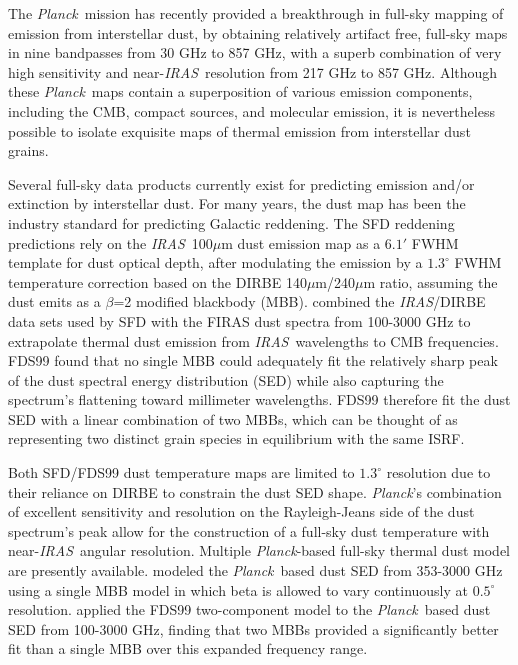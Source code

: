 \documentclass{emulateapj}
\newcommand{\IRAS}{{\it IRAS}}
\newcommand{\PLANCK}{{\it Planck}}
\begin{document}
The \PLANCK~mission \citep{planck2013,planck2015} has recently provided a 
breakthrough in full-sky mapping of emission from interstellar dust, by 
obtaining relatively artifact free, full-sky maps in nine bandpasses from 30 
GHz to 857 GHz, with a superb combination of very high sensitivity and 
near-\IRAS~resolution from 217 GHz to 857 GHz. Although these \PLANCK~maps 
contain a superposition of various emission components, including the CMB, 
compact sources, and molecular emission, it is nevertheless possible to isolate
exquisite maps of thermal emission from interstellar dust grains.

Several full-sky data products currently exist for predicting emission and/or
extinction by interstellar dust. For many years, the 
\citet[hereafter SFD]{SFD} dust map has been the industry standard for 
predicting Galactic reddening. The SFD reddening predictions rely on the
\IRAS~100$\mu$m dust emission map as a $6.1'$ FWHM template for dust optical 
depth, after modulating the emission by a $1.3^{\circ}$ FWHM temperature 
correction based on the DIRBE 140$\mu$m/240$\mu$m ratio, assuming the dust
emits as a $\beta$=2 modified blackbody (MBB). \citet[henceforth FDS99]{FDS99} 
combined the \IRAS/DIRBE data sets used by SFD with the FIRAS \citep{firas} 
dust spectra from 100-3000 GHz to extrapolate thermal dust emission from 
\IRAS~wavelengths to CMB frequencies. FDS99 found that no single MBB could
adequately fit the relatively sharp peak of the dust spectral energy 
distribution (SED) while also capturing the spectrum's flattening toward
millimeter wavelengths. FDS99 therefore fit the dust SED with a linear 
combination of two MBBs, which can be thought of as representing two 
distinct grain species in equilibrium with the same ISRF.

Both SFD/FDS99 dust temperature maps are limited to $1.3^{\circ}$ resolution 
due to their reliance on DIRBE to constrain the dust SED shape. \PLANCK's 
combination of excellent sensitivity and resolution on the Rayleigh-Jeans
side of the dust spectrum's peak allow for the construction of a full-sky dust 
temperature with near-\IRAS~angular resolution. Multiple \PLANCK-based full-sky
thermal dust model are presently available. \cite{planckdust} modeled the
\PLANCK~based dust SED from 353-3000 GHz using a single MBB model in which
beta is allowed to vary continuously at $0.5^{\circ}$ resolution. 
\cite{meisner15} applied the FDS99 two-component model to the \PLANCK~based
dust SED from 100-3000 GHz, finding that two MBBs provided a significantly
better fit than a single MBB over this expanded frequency range.
\end{document}
